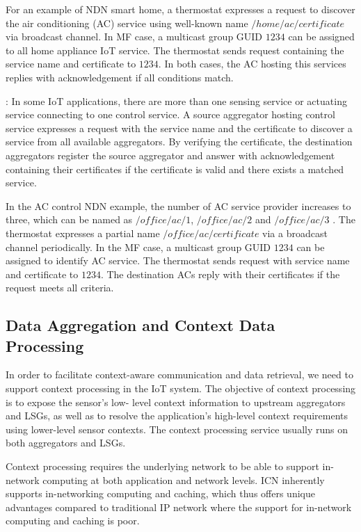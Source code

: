 For an example of NDN smart home, a thermostat expresses a request to discover the air conditioning (AC) service using well-known name $/home/ac/certificate$ via broadcast channel. In MF case, a multicast group GUID $1234$ can be assigned to all home appliance IoT service. The thermostat sends request containing the service name and certificate to $1234$. In both cases, the AC hosting this services replies with acknowledgement if all conditions match.

\vspace{1mm}: In some IoT applications, there are more than one sensing service or actuating service connecting to one control service. A source aggregator hosting control service expresses a request with the service name and the  certificate to discover a service from all  available aggregators. By verifying the certificate, the destination aggregators  register the source aggregator and  answer with acknowledgement containing their certificates if the certificate is valid and there exists a matched service.

In the AC control NDN example, the number of AC service provider increases to three, which can be named as $/office/ac/1$, $/office/ac/2$ and $/office/ac/3$ . The thermostat expresses a partial name $/office/ac/certificate$ via a broadcast channel periodically. In the MF case, a multicast group GUID $1234$ can be assigned to identify AC service. The thermostat sends request with service name and certificate to $1234$. The destination ACs reply with their certificates if the request meets all criteria.
\fi

\subsection{Data Aggregation and Context Data Processing}
In order to facilitate context-aware communication and data
retrieval, we need to support context processing in the IoT system.
The objective of context processing is to expose the sensor's low-
level context information to upstream aggregators and LSGs, as well
as to resolve the application's high-level context requirements using
lower-level sensor contexts.  The context processing service usually
runs on both aggregators and LSGs.

Context processing requires the underlying network to be able to
support in-network computing at both application and network levels.
ICN inherently supports in-networking computing and caching, which
thus offers unique advantages compared to traditional IP network
where the support for in-network computing and caching is poor.

